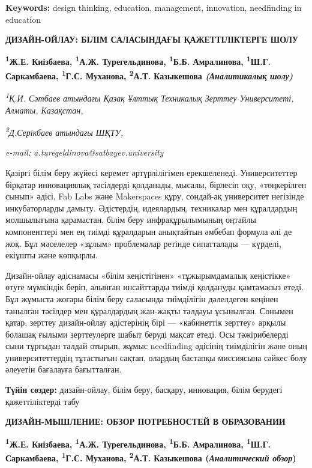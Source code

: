 {\bfseries Keywords:} design thinking, education, management, innovation,
needfinding in education

\begin{articleheader}
{\bfseries ДИЗАЙН-ОЙЛАУ: БІЛІМ САЛАСЫНДАҒЫ ҚАЖЕТТІЛІКТЕРГЕ ШОЛУ}

{\bfseries  
\textsuperscript{1}Ж.Е. Киізбаева,  
\textsuperscript{1}А.Ж. Турегельдинова\textsuperscript{\envelope },  
\textsuperscript{1}Б.Б. Амралинова,  
\textsuperscript{1}Ш.Г. Саркамбаева,  
\textsuperscript{1}Г.С. Муханова,  
\textsuperscript{2}А.Т. Казыкешова  
\emph{(Аналитикалық шолу)}}
\end{articleheader}

\begin{affiliation}
\emph{\textsuperscript{1}Қ.И. Сәтбаев атындағы Қазақ Ұлттық Техникалық Зерттеу Университеті, Алматы, Казақстан,}

\emph{\textsuperscript{2}Д.Серікбаев атындағы ШҚТУ,}

\emph{e-mail: a.turegeldinova@satbayev.university}
\end{affiliation}

Қазіргі білім беру жүйесі керемет әртүрлілігімен ерекшеленеді.
Университеттер бірқатар инновациялық тәсілдерді қолданады, мысалы,
бірлесіп оқу, «төңкерілген сынып» әдісі, Fab Labs және Makerspaces құру,
сондай-ақ университет негізінде инкубаторларды дамыту. Әдістердің,
идеялардың, техникалар мен құралдардың молшылығына қарамастан, білім
беру инфрақұрылымының оңтайлы компоненттері мен ең тиімді құралдарын
анықтайтын әмбебап формула әлі де жоқ. Бұл мәселелер «зұлым» проблемалар
ретінде сипатталады --- күрделі, екіұшты және көпқырлы.

Дизайн-ойлау әдіснамасы «білім кеңістігінен» «тұжырымдамалық кеңістікке»
өтуге мүмкіндік беріп, алынған инсайттарды тиімді қолдануды қамтамасыз
етеді. Бұл жұмыста жоғары білім беру саласында тиімділігін дәлелдеген
кеңінен танылған тәсілдер мен құралдардың жан-жақты талдауы ұсынылған.
Сонымен қатар, зерттеу дизайн-ойлау әдістерінің бірі --- «кабинеттік
зерттеу» арқылы болашақ ғылыми зерттеулерге шабыт беруді мақсат етеді.
Осы тәжірибелерді сыни тұрғыдан талдай отырып, жұмыс needfinding
әдісінің тиімділігін және оның университеттердің тұтастығын сақтап,
олардың бастапқы миссиясына сәйкес болу әлеуетін бағалауға бағытталған.

{\bfseries Түйін сөздер:} дизайн-ойлау, білім беру, басқару, инновация,
білім берудегі қажеттіліктерді табу

\begin{articleheader}
{\bfseries ДИЗАЙН-МЫШЛЕНИЕ: ОБЗОР ПОТРЕБНОСТЕЙ В ОБРАЗОВАНИИ}

{\bfseries  
\textsuperscript{1}Ж.Е. Киізбаева,  
\textsuperscript{1}А.Ж. Турегельдинова\textsuperscript{\envelope },  
\textsuperscript{1}Б.Б. Амралинова,  
\textsuperscript{1}Ш.Г. Саркамбаева,  
\textsuperscript{1}Г.С. Муханова,  
\textsuperscript{2}А.Т. Казыкешова  
(\emph{Аналитический обзор})}
\end{articleheader}

